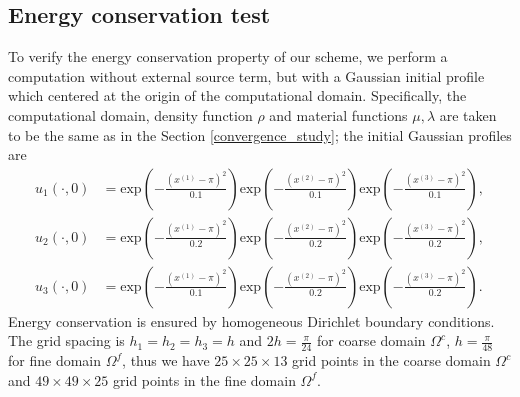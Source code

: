 \subsection{Energy conservation test}\label{conserved_energy}
To verify the energy conservation property of our scheme, we perform a computation without external source term, but with a Gaussian initial profile which centered at the origin of the computational domain.  Specifically, the computational domain, density function $\rho$ and material functions $\mu, \lambda$ are taken to be the same as in the Section \ref{convergence_study}; the initial Gaussian profiles are
\begin{align*}
	u_1(\cdot,0) &= \mbox{exp}\left(-\frac{(x^{(1)}-\pi)^2}{0.1}\right)\mbox{exp}\left(-\frac{(x^{(2)}-\pi)^2}{0.1}\right)\mbox{exp}\left(-\frac{(x^{(3)}-\pi)^2}{0.1}\right),\\
	u_2(\cdot,0) &= \mbox{exp}\left(-\frac{(x^{(1)}-\pi)^2}{0.2}\right)\mbox{exp}\left(-\frac{(x^{(2)}-\pi)^2}{0.2}\right)\mbox{exp}\left(-\frac{(x^{(3)}-\pi)^2}{0.2}\right),\\
	u_3(\cdot,0) &= \mbox{exp}\left(-\frac{(x^{(1)}-\pi)^2}{0.1}\right)\mbox{exp}\left(-\frac{(x^{(2)}-\pi)^2}{0.2}\right)\mbox{exp}\left(-\frac{(x^{(3)}-\pi)^2}{0.2}\right).
\end{align*}
Energy conservation is ensured by homogeneous Dirichlet boundary conditions. The grid spacing is $h_1 = h_2 = h_3 = h$ and $2h = \frac{\pi}{24}$ for coarse domain $\Omega^c$, $h = \frac{\pi}{48}$ for fine domain $\Omega^f$, thus we have $25\times25\times13$ grid points in the coarse domain $\Omega^c$ and $49\times49\times25$ grid points in the fine domain $\Omega^f$. 

